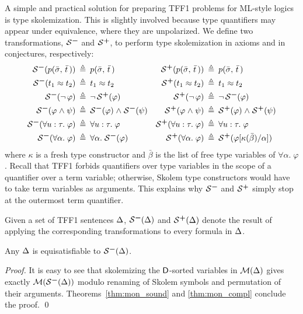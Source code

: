 A simple and practical solution for preparing TFF1 problems
for ML-style logics is type skolemization. This is slightly involved because
type quantifiers may appear under equivalence, where they are unpolarized.
%
We define two transformations, $\SKOM$ and $\mathcal{S}\text{\textsuperscript{\kern.1ex\bfseries+}}$, to perform type
skolemization in axioms and in conjectures, respectively:
%
\begin{align*}
\SKOM(p(\bar{\sigma},\,\bar{t}\,)) &\eqdef p(\bar{\sigma},\,\bar{t}\,) &
\SKOP(p(\bar{\sigma},\,\bar{t}\,)) &\eqdef p(\bar{\sigma},\,\bar{t}\,) \\
\SKOM(t_1 \eq t_2) &\eqdef t_1 \eq t_2 &
\SKOP(t_1 \eq t_2) &\eqdef t_1 \eq t_2 \\
\SKOM(\lnot\, \varphi) &\eqdef \lnot\, \SKOP(\varphi) &
\SKOP(\lnot\, \varphi) &\eqdef \lnot\, \SKOM(\varphi) \\
\SKOM(\varphi \rand \psi) &\eqdef \SKOM(\varphi) \rand \SKOM(\psi) &
\SKOP(\varphi \rand \psi) &\eqdef \SKOP(\varphi) \rand \SKOP(\psi) \\
\SKOM(\forall u \ty \tau .\; \varphi) &\eqdef \forall u \ty \tau .\; \varphi &
\SKOP(\forall u \ty \tau .\; \varphi) &\eqdef \forall u \ty \tau .\; \varphi \\
\SKOM(\forall \alpha .\; \varphi) &\eqdef \forall \alpha .\; \SKOM(\varphi) &
\SKOP(\forall \alpha .\; \varphi) &\eqdef
\SKOP(\varphi[\kappa(\bar\beta)/\alpha])
\end{align*}
where $\kappa$ is a fresh type constructor and $\bar\beta$ is the list of free
type variables of $\forall \alpha .\; \varphi$.
Recall that TFF1 forbids quantifiers over type variables in the scope
of a quantifier over a term variable; otherwise, Skolem type constructors
would have to take term variables as arguments. This explains why $\SKOM$ and
$\mathcal{S}\text{\textsuperscript{\kern.1ex\bfseries+}}$ simply stop at the outermost term quantifier.

Given a set of TFF1 sentences $\mathrm{\Delta}$,
$\SKOM(\DEL)$ and $\mathcal{S}\text{\textsuperscript{\kern.1ex\bfseries+}}(\mathrm{\Delta})$ denote the result of applying
the corresponding transformations to every formula in $\mathrm{\Delta}$.

\begin{theorem} \label{thm:sko}
Any\/ $\mathrm{\Delta}$ is equisatisfiable to $\SKOM(\DEL)$.
\end{theorem}
\begin{proof}
It is easy to see that
skolemizing the $\mathsf{D}$-sorted variables in $\mathcal{M}(\mathrm{\Delta})$ gives
exactly $\MON(\SKOM(\DEL))$ modulo renaming of Skolem symbols and
permutation of their arguments. Theorems~\ref{thm:mon_sound} and
\ref{thm:mon_compl} conclude the proof.
\qed
\end{proof}

%
